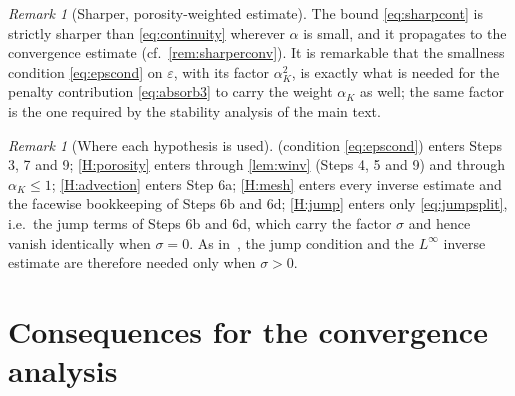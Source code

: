 \documentclass[11pt,a4paper]{article}
\theoremstyle{plain}
\theoremstyle{remark}
\newtheorem{remark}[lemma]{Remark}
\theoremstyle{definition}
\numberwithin{equation}{section}
\begin{document}
\begin{remark}[Sharper, porosity-weighted estimate]\label{rem:sharper}
The bound \eqref{eq:sharpcont} is strictly sharper than \eqref{eq:continuity} wherever
$\alpha$ is small, and it propagates to the convergence estimate (cf.\
\cref{rem:sharperconv}). It is remarkable that the smallness condition
\eqref{eq:epscond} on $\varepsilon$, with its factor $\alpha_K^2$, is exactly what is
needed for the penalty contribution \eqref{eq:absorb3} to carry the weight $\alpha_K$ as
well; the same factor is the one required by the stability analysis of the main text.
\end{remark}

\begin{remark}[Where each hypothesis is used]\label{rem:hypotheses}
\Cref{H:data} (condition \eqref{eq:epscond}) enters Steps 3, 7 and 9;
\cref{H:porosity} enters through \cref{lem:winv} (Steps 4, 5 and 9) and through
$\alpha_K\le1$; \cref{H:advection} enters Step 6a; \cref{H:mesh} enters every inverse
estimate and the facewise bookkeeping of Steps 6b and 6d; \cref{H:jump} enters only
\eqref{eq:jumpsplit}, i.e.\ the jump terms of Steps 6b and 6d, which carry the factor
$\sigma$ and hence vanish identically when $\sigma=0$. As in~\cite{codina2001}, the jump
condition and the $L^\infty$ inverse estimate are therefore needed only when $\sigma>0$.
\end{remark}

\section{Consequences for the convergence analysis}\label{sec:convergence}
\end{document}
